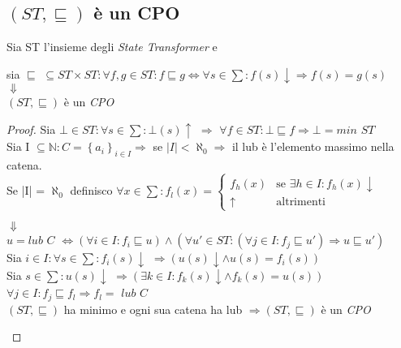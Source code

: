 \documentclass[a4paper, 10pt]{article} %
\begin{document}
\subsection{$(ST, \sqsubseteq)$ è un CPO}
\begin{esercizio}
  Sia ST l'insieme degli \emph{State Transformer} e
  \begin{center}
    sia $\sqsubseteq$ $\subseteq ST \times ST :
    \forall f,g \in ST : f \sqsubseteq g \Longleftrightarrow \forall s \in \sum :
    f(s)\downarrow \Rightarrow f(s) = g(s)$\\
    $\Downarrow$\\
    $(ST, \sqsubseteq)$ è un \emph{CPO}
  \end{center}
  \begin{proof}
    Sia $\bot \in ST : \forall s \in \sum : \bot(s)\uparrow$ $\Rightarrow$ $\forall f \in ST : \bot \sqsubseteq f \Rightarrow \bot = min$ $ST $\\
    Sia I $\subseteq \mathbb{N} : C = \left\{a_i\right\}_{i \in I} \Rightarrow$ se $|I| < \aleph_0 \Rightarrow$ il lub è l'elemento massimo nella catena.\\
    Se |I| = $\aleph_0$ definisco $\forall x \in \sum : f_l(x) = 
    \begin{cases} 
      f_h(x) & \text{se } \exists h \in I : f_h(x)\downarrow
      \\ 
      \uparrow & \text{altrimenti} 
    \end{cases} $
    \begin{center}
      $\Downarrow$\\
      $u = lub$ $C$ $\Longleftrightarrow (\forall i \in I : f_i \sqsubseteq u) \land (\forall u' \in ST : (\forall j \in I : f_j \sqsubseteq u') \Rightarrow u \sqsubseteq u')$\\
      Sia $i \in I : \forall s \in \sum : f_i(s)\downarrow$ $\Rightarrow (u(s)\downarrow \land u(s)=f_i(s))$\\
      Sia $s \in \sum : u(s)\downarrow$ $\Rightarrow (\exists k \in I : f_k(s)\downarrow \land f_k(s)=u(s))$\\
      $\forall j \in I : f_j \sqsubseteq f_l \Rightarrow f_l =$ $lub$ $C$ \\
      $(ST, \sqsubseteq)$ ha minimo e ogni sua catena ha lub $\Rightarrow (ST, \sqsubseteq)$ è un \emph{CPO}
    \end{center}
  \end{proof}
\end{esercizio}
\end{document}
